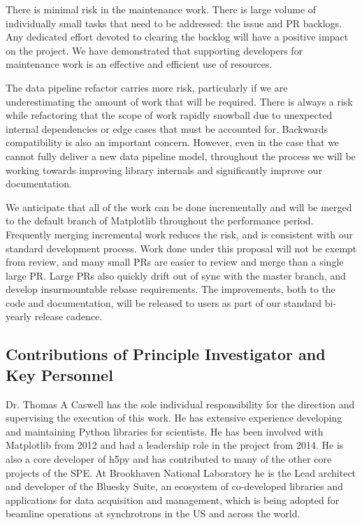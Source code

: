 \documentclass[12pt]{article}
\numberwithin{page}{section}
\begin{document}
There is minimal risk in the maintenance work.  There is large volume
of individually small tasks that need to be addressed: the issue and
PR backlogs.  Any dedicated effort devoted to clearing the backlog
will have a positive impact on the project.  We have demonstrated that
supporting developers for maintenance work is an effective and
efficient use of resources.

The data pipeline refactor carries more risk, particularly if we are
underestimating the amount of work that will be required.  There is
always a risk while refactoring that the scope of work rapidly
snowball due to unexpected internal dependencies or edge cases that
must be accounted for.  Backwards compatibility is also an important
concern.  However, even in the case that we cannot fully deliver a new
data pipeline model, throughout the process we will be working towards
improving library internals and significantly improve our
documentation.

We anticipate that all of the work can be done incrementally and will
be merged to the default branch of Matplotlib throughout the
performance period.  Frequently merging incremental work reduces the
risk, and is consistent with our standard development process.  Work
done under this proposal will not be exempt from review, and many
small PRs are easier to review and merge than a single large PR.
Large PRs also quickly drift out of sync with the master branch, and
develop insurmountable rebase requirements.  The improvements, both to
the code and documentation, will be released to users as part of our
standard bi-yearly release cadence.


\subsection{Contributions of Principle Investigator and Key Personnel}

Dr. Thomas A Caswell has the sole individual responsibility for the
direction and supervising the execution of this work.  He has
extensive experience developing and maintaining Python libraries for
scientists.  He has been involved with Matplotlib from 2012 and had a
leadership role in the project from 2014.  He is also a core developer
of h5py and has contributed to many of the other core projects of the
SPE.  At Brookhaven National Laboratory he is the Lead architect and
developer of the Bluesky Suite, an ecosystem of co-developed libraries
and applications for data acquisition and management, which is being
adopted for beamline operations at synchrotrons in the US and across
the world.
\end{document}
